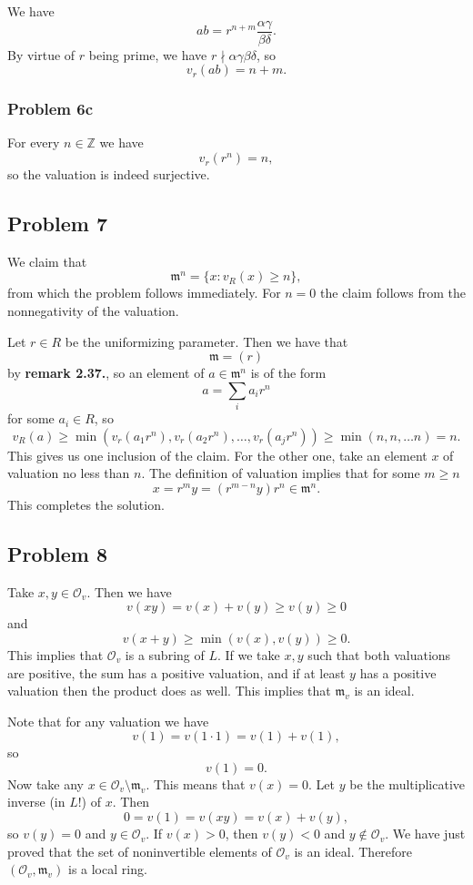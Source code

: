 We have
\[ 
    ab = r^{n+m} \frac{\alpha\gamma}{\beta\delta}. 
\]
By virtue of \( r\) being prime, we have \( r \nmid \alpha\gamma\beta\delta \),
so
\[ 
    v_r(ab) = n + m. 
\]

\subsubsection*{Problem 6c}

For every \( n \in \mathbb{Z} \) we have
\[ 
    v_r(r^n) = n,   
\]
so the valuation is indeed surjective.

\subsection*{Problem 7}

We claim that
\[ 
    \mathfrak{m}^n = \{ x : v_R(x) \geqslant n \}, 
\]
from which the problem follows immediately. For \( n = 0 \) the claim follows
from the nonnegativity of the valuation.

Let \( r \in R \) be the uniformizing parameter. Then we have that 
\[ 
    \mathfrak{m} = (r)
\]
by {\bf remark 2.37.}, so an element of \(a \in \mathfrak{m}^n \) is of the form
\[ 
    a = \sum_i a_i r^n
\]
for some \( a_i \in R \), so 
\[ 
    v_R(a) \geqslant \min (v_r(a_1r^n), v_r(a_2r^n), \ldots, v_r(a_jr^n))
    \geqslant \min ( n, n, \ldots n ) = n.
\]
This gives us one inclusion of the claim. For the other one, take an element
\( x \) of valuation no less than \( n \). The definition of valuation implies
that for some \( m \geqslant n \)
\[ 
    x = r^m y = (r^{m-n}y) r^n \in \mathfrak{m}^n.
\]
This completes the solution.


\subsection*{Problem 8}

Take \( x, y \in \mathcal{O}_v \). Then we have
\[ 
v(xy) = v(x) + v(y) \geqslant v(y) \geqslant 0
\]
and
\[ 
    v(x + y) \geqslant \min (v(x), v(y)) \geqslant 0. 
\]
This implies that \( \mathcal{O}_v \) is a subring of \( L \).
If we take \( x,y \) such that both valuations are positive, the sum has
a positive valuation, and if at least \( y \) has a positive valuation
then the product does as well. This implies that \( \mathfrak{m}_v \) is an ideal.

Note that for any valuation we have
\[ 
    v(1) = v(1 \cdot 1) = v(1) + v(1), 
\]
so
\[ 
    v(1) = 0. 
\]
Now take any \( x \in \mathcal{O}_v \setminus \mathfrak{m}_v \). This means
that \( v(x) = 0 \). Let \( y \) be the multiplicative inverse (in \( L \)!)
of \( x \). Then
\[ 
    0 = v(1) = v(xy) = v(x) + v(y), 
\]
so \( v(y) = 0\) and \( y \in \mathcal{O}_v \). If \( v(x) > 0 \), then \( v(y) < 0\)
and \( y \not\in \mathcal{O}_v \). We have just proved that the set of noninvertible
elements of \( \mathcal{O}_v \) is an ideal. Therefore \( (\mathcal{O}_v, \mathfrak{m}_v) \)
is a local ring.

